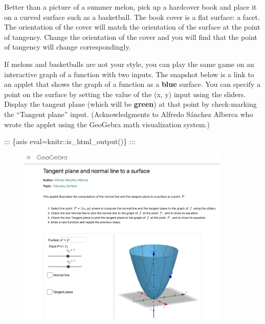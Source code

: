 \documentclass[
  letterpaper,
  DIV=11,
  numbers=noendperiod,
  oneside]{scrreprt}
\begin{document}
Better than a picture of a summer melon, pick up a hardcover book and
place it on a curved surface such as a basketball. The book cover is a
flat surface: a facet. The orientation of the cover will match the
orientation of the surface at the point of tangency. Change the
orientation of the cover and you will find that the point of tangency
will change correspondingly.

If melons and basketballs are not your style, you can play the same game
on an interactive graph of a function with two inputs. The snapshot
below is a link to an applet that shows the graph of a function as a
\textbf{blue} surface. You can specify a point on the surface by setting
the value of the (x, y) input using the sliders. Display the tangent
plane (which will be \textbf{green}) at that point by check-marking the
``Tangent plane'' input. (Acknowledgments to Alfredo Sánchez Alberca who
wrote the applet using the GeoGebra math visualization system.)

::: \{asis eval=knitr::is\_html\_output()\} :::

\begin{figure}


{\centering \includegraphics[width=0.9\textwidth,height=\textheight]{Differentiation/www/geogebra-tangent-app.png}

}

\end{figure}
\end{document}
